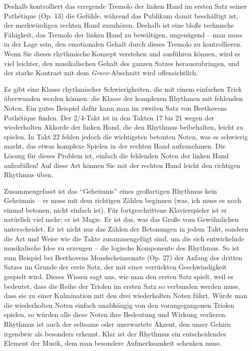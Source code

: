 Deshalb kontrolliert das erregende Tremolo der linken Hand im ersten Satz seiner Pathétique (Op. 13) die Gefühle, während das Publikum damit beschäftigt ist, der merkwürdigen rechten Hand zuzuhören.
Deshalb ist eine bloße technische Fähigkeit, das Tremolo der linken Hand zu bewältigen, ungenügend -- man muss in der Lage sein, den emotionalen Gehalt durch dieses Tremolo zu kontrollieren.
Wenn Sie dieses rhythmische Konzept verstehen und ausführen können, wird es viel leichter, den musikalischen Gehalt des ganzen Satzes herauszubringen, und der starke Kontrast mit dem \textit{Grave}-Abschnitt wird offensichtlich.

Es gibt eine Klasse rhythmischer Schwierigkeiten, die mit einem einfachen Trick überwunden werden können: die Klasse der komplexen Rhythmen mit fehlenden Noten.
Ein gutes Beispiel dafür kann man im zweiten Satz von Beethovens Pathétique finden.
Der 2/4-Takt ist in den Takten 17 bis 21 wegen der wiederholten Akkorde der linken Hand, die den Rhythmus beibehalten, leicht zu spielen.
In Takt 22 fehlen jedoch die wichtigsten betonten Noten, was es schwierig macht, das etwas komplexe Spielen in der rechten Hand aufzunehmen.
Die Lösung für dieses Problem ist, einfach die fehlenden Noten der linken Hand aufzufüllen!
Auf diese Art können Sie mit der rechten Hand leicht den richtigen Rhythmus üben.

Zusammengefasst ist das \enquote{Geheimnis} eines großartigen Rhythmus kein Geheimnis -- er muss mit dem richtigen Zählen beginnen (was, ich muss es noch einmal betonen, nicht einfach ist).
Für fortgeschrittene Klavierspieler ist er natürlich viel mehr; er ist Magie.
Er ist das, was das Große vom Gewöhnlichen unterscheidet.
Er ist nicht nur das Zählen der Betonungen in jedem Takt, sondern die Art und Weise wie die Takte zusammengefügt sind, um die sich entwickelnde musikalische Idee zu erzeugen -- die logische Komponente des Rhythmus.
So ist zum Beispiel bei Beethovens Mondscheinsonate (Op. 27) der Anfang des dritten Satzes im Grunde der erste Satz, der mit einer verrückten Geschwindigkeit gespielt wird.
Dieses Wissen sagt uns, wie man den ersten Satz spielt, weil es bedeutet, dass die Reihe der Triolen im ersten Satz so verbunden werden muss, dass sie zu einer Kulmination mit den drei wiederholten Noten führt.
Würde man die wiederholten Noten einfach unabhängig von den vorangegangenen Triolen spielen, so würden alle diese Noten ihre Bedeutung und Wirkung verlieren.
Rhythmus ist auch der seltsame oder unerwartete Akzent, den unser Gehirn irgendwie als besonders erkennt.
Klar ist der Rhythmus ein entscheidendes Element der Musik, dem man besondere Aufmerksamkeit schenken muss.
 

